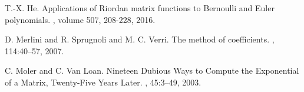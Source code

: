 



\begin{thebibliography}{10}


\bibitem{}

T.-X. He.
\newblock Applications of Riordan matrix functions to Bernoulli and Euler polynomials.
, volume 507, 208-228, 2016.

D. Merlini and R. Sprugnoli and M. C. Verri.
\newblock The method of coefficients.
, 114:40--57, 2007.

C. Moler and C. Van Loan.
\newblock Nineteen Dubious Ways to Compute the Exponential of a Matrix, Twenty-Five Years Later.
, 45:3--49, 2003.



\end{thebibliography}

